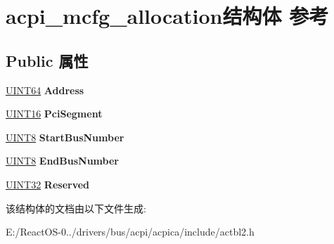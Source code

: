 \hypertarget{structacpi__mcfg__allocation}{}\section{acpi\+\_\+mcfg\+\_\+allocation结构体 参考}
\label{structacpi__mcfg__allocation}
\subsection*{Public 属性}
\begin{DoxyCompactItemize}
\item 
\mbox{\label{structacpi__mcfg__allocation_a2c4743d3cedd242791567ea6f7d15867}} 
\hyperlink{_processor_bind_8h_a57be03562867144161c1bfee95ca8f7c}{U\+I\+N\+T64} {\bfseries Address}
\item 
\mbox{\label{structacpi__mcfg__allocation_ac2c712b9c29caa3c0d6f6d2a6617f655}} 
\hyperlink{_processor_bind_8h_a09f1a1fb2293e33483cc8d44aefb1eb1}{U\+I\+N\+T16} {\bfseries Pci\+Segment}
\item 
\mbox{\label{structacpi__mcfg__allocation_ad46423e087e63c319f674bc683dd8ab6}} 
\hyperlink{_processor_bind_8h_ab27e9918b538ce9d8ca692479b375b6a}{U\+I\+N\+T8} {\bfseries Start\+Bus\+Number}
\item 
\mbox{\label{structacpi__mcfg__allocation_a6a2318c05c540d1900bbc86d8d15082e}} 
\hyperlink{_processor_bind_8h_ab27e9918b538ce9d8ca692479b375b6a}{U\+I\+N\+T8} {\bfseries End\+Bus\+Number}
\item 
\mbox{\label{structacpi__mcfg__allocation_ab9b6f254351143454780da89f8213a3f}} 
\hyperlink{_processor_bind_8h_ae1e6edbbc26d6fbc71a90190d0266018}{U\+I\+N\+T32} {\bfseries Reserved}
\end{DoxyCompactItemize}


该结构体的文档由以下文件生成\+:\begin{DoxyCompactItemize}
\item 
E\+:/\+React\+O\+S-\/0../drivers/bus/acpi/acpica/include/actbl2.\+h\end{DoxyCompactItemize}

